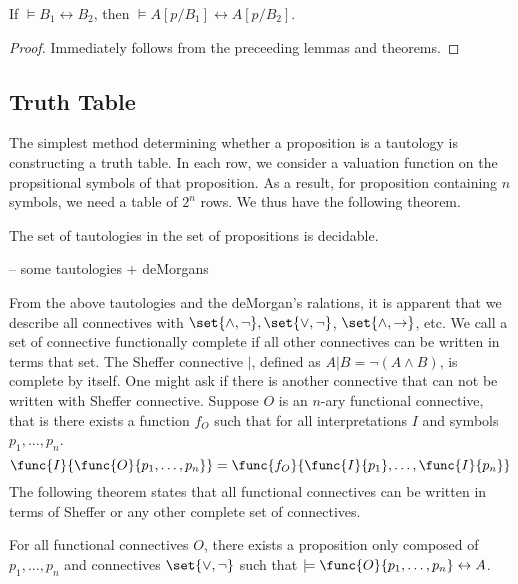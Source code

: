 \begin{theorem}[Substituition]
    If \(\models B_1 \leftrightarrow B_2\), then \(\models A[p/B_1] \leftrightarrow A[p/B_2]\).
\end{theorem}

\begin{proof}
    Immediately follows from the preceeding lemmas and theorems. 
\end{proof}

\subsection{Truth Table}
The simplest method determining whether a proposition is a tautology is constructing a truth table. In each row, we consider a valuation function on the propsitional symbols of that proposition. As a result, for proposition containing \(n\) symbols, we need a table of \(2^n\) rows. We thus have the following theorem.

\begin{theorem}
    The set of tautologies in the set of propositions is decidable.
\end{theorem}

-- some tautologies + deMorgans

From the above tautologies and the deMorgan's ralations, it is apparent that we describe all connectives with \(\set{\land, \neg}, \set{\lor,\neg}\), \(\set{\land,\to}\), etc. We call a set of connective functionally complete if all other connectives can be written in terms that set. The Sheffer connective \(|\), defined as \(A | B = \neg (A \land B)\), is complete by itself. One might ask if there is another connective that can not be written with Sheffer connective. Suppose \(O\) is an \(n\)-ary functional connective, that is there exists a function \(f_O\) such that for all interpretations \(I\) and symbols \(p_1,\dots,p_n\).
\begin{equation*}
    \func{I}{\func{O}{p_1,\dots, p_n}} = \func{f_O}{\func{I}{p_1}, \dots, \func{I}{p_n}}
\end{equation*} 
The following theorem states that all functional connectives can be written in terms of Sheffer or any other complete set of connectives.

\begin{theorem}
    For all functional connectives \(O\), there exists a proposition only composed of \(p_1,\dots,p_n\) and connectives \(\set{\lor,\neg}\) such that \(\models \func{O}{p_1,\dots,p_n} \leftrightarrow A\).
\end{theorem}

